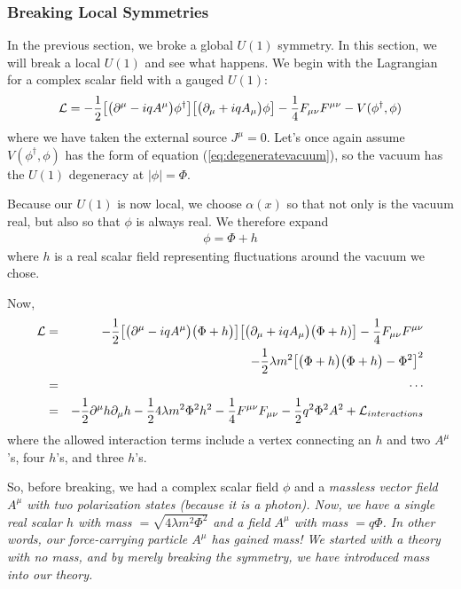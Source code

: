 \documentclass[12pt,epsf]{article}
\def\nolabel{\nonumber }
\def\nolabel{\nonumber }
\begin{document}
\subsubsection{Breaking Local Symmetries}
\label{sec:breakinglocalsymmetries}

In the previous section, we broke a global $U(1)$ symmetry.  In this
section, we will break a local $U(1)$ and see what happens.  We begin
with the Lagrangian for a complex scalar field with a gauged $U(1)$:
\begin{eqnarray}
\mathcal{L} = -{1\over 2} \big[ \big( \partial^{\mu} -
iqA^{\mu}\big)\phi^{\dagger}\big]\big[\big(\partial_{\mu}+
iqA_{\mu}\big)\phi\big] - {1\over 4}F_{\mu \nu}F^{\mu \nu} -
V(\phi^{\dagger},\phi)\nolabel
\end{eqnarray}
where we have taken the external source $J^{\mu} = 0$.	Let's once
again assume $V(\phi^{\dagger},\phi)$ has the form of equation
(\ref{eq:degeneratevacuum}), so the vacuum has the $U(1)$ degeneracy at
$|\phi| = \Phi$.  

Because our $U(1)$ is now local, we choose $\alpha(x)$ so that not only
is the vacuum real, but also so that $\phi$ is always real.  We
therefore expand
\begin{eqnarray}
\phi = \Phi + h \label{eq:firsthiggs}
\end{eqnarray}
where $h$ is a real scalar field representing fluctuations around the
vacuum we chose.  

Now,
\begin{eqnarray}
\mathcal{L} &=& -{1\over 2} \big[\big(\partial^{\mu} -
iqA^{\mu}\big)\big(\Phi + h\big)\big]\big[\big(\partial_{\mu}+
iqA_{\mu}\big)\big(\Phi + h)\big] - {1\over 4} F_{\mu \nu}F^{\mu \nu}
\nolabel \\
& & -{1\over 2}\lambda m^2\big[\big(\Phi + h\big)\big(\Phi + h \big) -
\Phi^2\big]^2 \nolabel \\
&=& \cdots \nolabel \\
&=& -{1\over 2} \partial^{\mu}h \partial_{\mu}h - {1\over 2}4 \lambda
m^2\Phi^2h^2 - {1\over 4}F^{\mu \nu}F_{\mu \nu} - {1\over 2}q^2\Phi^2
A^2 + \mathcal{L}_{interactions}\nolabel
\end{eqnarray}
where the allowed interaction terms include a vertex connecting an $h$
and two $A^{\mu}$'s, four $h$'s, and three $h$'s.  

So, before breaking, we had a complex scalar field $\phi$ and a
\it massless \rm vector field $A^{\mu}$ with two polarization
states (because it is a photon).  Now, we have a single real scalar $h$
with mass $=\sqrt{4\lambda m^2\Phi^2}$ and a field $A^{\mu}$ with mass
$=q\Phi$.  In other words, our force-carrying particle $A^{\mu}$ has
gained mass!  We started with a theory with no mass, and by  merely
breaking the symmetry, we have introduced mass into our theory.  
\end{document}
